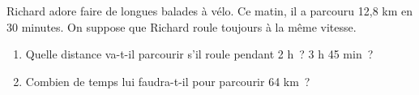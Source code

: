 \documentclass[exercice]{thedocument}%
\begin{document}
%
Richard adore faire de longues balades à vélo. Ce matin, il a parcouru 12,8 km
en 30 minutes. On suppose que Richard roule toujours à la même vitesse.
\begin{enumerate}
    \item Quelle distance va-t-il parcourir s'il roule pendant 2 h~? 3 h 45 min~?
    \item Combien de temps lui faudra-t-il pour parcourir 64 km~?
\end{enumerate}
\end{document}
